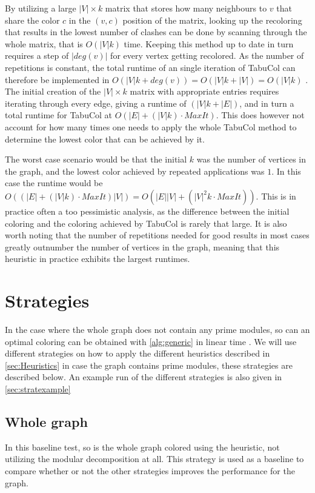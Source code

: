 \documentclass[a4paper]{article}
\begin{document}
By utilizing a large $|V| \times k$ matrix that stores how many neighbours to $v$ that share
the color $c$ in the $(v,c)$ position of the matrix, looking up the recoloring
that results in the lowest number of clashes can be done by scanning through 
the whole matrix, that is $O(|V|k)$ time.
Keeping this method up to date in turn requires a step of $|deg(v)|$ for every
vertex getting recolored.  As the number of repetitions is constant, the total
runtime of an single iteration of TabuCol can therefore be implemented in
$O(|V|k+deg(v)) = O(|V|k+|V|) = O(|V|k)$ \cite{Constructive}. The initial
creation of the $|V| \times k$ matrix with appropriate entries requires
iterating through every edge, giving a runtime of $(|V|k+|E|)$, and in turn a 
total runtime for TabuCol at $O(|E|+(|V|k)\cdot MaxIt)$. This does however
not account for how many times one needs to apply the whole TabuCol method to
determine the lowest color that can be achieved by it.

The worst case scenario would be that the initial $k$ was the number of
vertices in the graph, and the lowest color achieved by repeated applications
was $1$. In this case the runtime would be $O((|E|+(|V|k)\cdot MaxIt)|V|) = O(
|E||V| + (|V|^2k\cdot MaxIt))$. This is in practice often a too
pessimistic analysis, as the difference between the initial coloring and the
coloring achieved by TabuCol is rarely that large. It is also worth noting that
the number of repetitions needed for good results in most cases greatly
outnumber the number of vertices in the graph, meaning that this heuristic in
practice exhibits the largest runtimes.

\section{Strategies}
\label{sec:Strategies}
In the case where the whole graph does not contain any prime modules, so can an
optimal coloring can be obtained with \autoref{alg:generic} in linear time
\cite{HCL}.  We will use different
strategies on how to apply the different heuristics described in
\autoref{sec:Heuristics} in case the graph contains prime modules, these strategies are described below. An example run of the
different strategies is also given in \autoref{sec:stratexample}

\subsection{Whole graph}

In this baseline test, so is the whole graph colored using the heuristic, not
utilizing the modular decomposition at all. This strategy is used as a baseline
to compare whether or not the other strategies improves the performance for the
graph.
\end{document}
